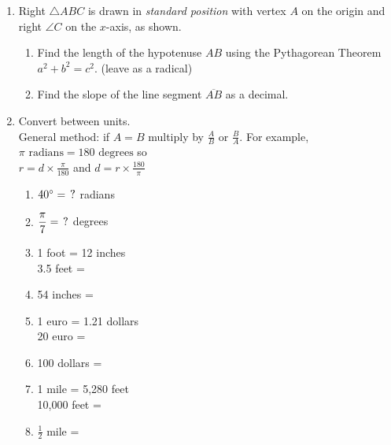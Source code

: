\documentclass[12pt, twoside]{article}
\begin{document}
\begin{enumerate}
\newpage
\item Right $\triangle ABC$ is drawn in \emph{standard position} with vertex $A$ on the origin and right $\angle C$ on the $x$-axis, as shown.
\begin{multicols}{2}
  \raggedcolumns
\begin{enumerate}
  \item Find the length of the hypotenuse $AB$ using the Pythagorean Theorem $a^2 + b^2 = c^2$. (leave as a radical)
  \vspace{3cm}
  \item Find the slope of the line segment $\overline{AB}$ as a decimal.
\end{enumerate}
\end{multicols}

\newpage
\item Convert between units. \\[0.25cm]
General method: if $A = B$ multiply by $\displaystyle \frac{A}{B} \text{ or } \frac{B}{A}$. For example, $\pi \text{ radians}= 180 \text{ degrees}$ so \\
$\displaystyle r = d \times \frac{\pi}{180}$ and 
$\displaystyle d = r \times \frac{180}{\pi}$
\vspace{0.5cm}
  \begin{multicols}{2}
  \raggedcolumns
  \begin{enumerate}[itemsep=1.5cm]
    \item $40^\circ = \hspace{0.15cm} ?$ radians
    \item $\displaystyle \frac{\pi}{7}  = \hspace{0.15cm} ?$ degrees
    \item 1 foot = 12 inches\\[0.5cm]
    3.5 feet = 
    \item 54 inches = 
    \item 1 euro = 1.21 dollars\\[0.5cm]
    20 euro = 
    \item 100 dollars = 
    \item 1 mile = 5,280 feet\\[0.5cm]
    10,000 feet = 
    \item $\frac{1}{2}$ mile =   
  \end{enumerate}
  \end{multicols}
    

\end{enumerate}
\end{document}
